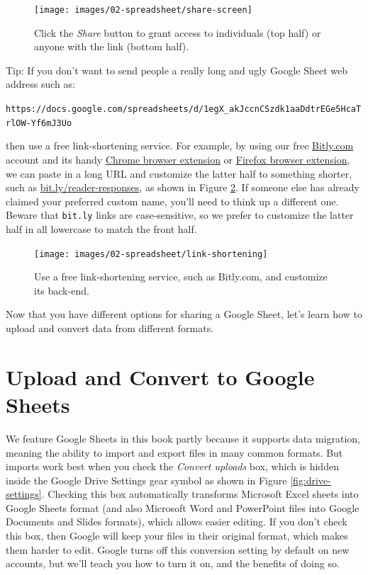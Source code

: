 \documentclass[
  english,
]{book}
\begin{document}
\begin{figure}
\texttt{[image: images/02-spreadsheet/share-screen]} \caption{Click the \emph{Share} button to grant access to individuals (top half) or anyone with the link (bottom half).}\label{fig:share-screen}
\end{figure}

Tip: If you don't want to send people a really long and ugly Google Sheet web address such as:

\texttt{https://docs.google.com/spreadsheets/d/1egX\_akJccnCSzdk1aaDdtrEGe5HcaTrlOW-Yf6mJ3Uo}

then use a free link-shortening service. For example, by using our free \href{https://bitly.com}{Bitly.com} account and its handy \href{https://chrome.google.com/webstore/detail/bitly-unleash-the-power-o/iabeihobmhlgpkcgjiloemdbofjbdcic}{Chrome browser extension} or \href{https://addons.mozilla.org/en-US/firefox/user/13352154/}{Firefox browser extension}, we can paste in a long URL and customize the latter half to something shorter, such as \href{https://bit.ly/reader-responses}{bit.ly/reader-responses}, as shown in Figure \ref{fig:link-shortening}. If someone else has already claimed your preferred custom name, you'll need to think up a different one. Beware that \texttt{bit.ly} links are case-sensitive, so we prefer to customize the latter half in all lowercase to match the front half.



\begin{figure}
\texttt{[image: images/02-spreadsheet/link-shortening]} \caption{Use a free link-shortening service, such as Bitly.com, and customize its back-end.}\label{fig:link-shortening}
\end{figure}

Now that you have different options for sharing a Google Sheet, let's learn how to upload and convert data from different formats.

\hypertarget{upload}{%
\section*{Upload and Convert to Google Sheets}\label{upload}}

We feature Google Sheets in this book partly because it supports data migration, meaning the ability to import and export files in many common formats. But imports work best when you check the \emph{Convert uploads} box, which is hidden inside the Google Drive Settings gear symbol as shown in Figure \ref{fig:drive-settings}. Checking this box automatically transforms Microsoft Excel sheets into Google Sheets format (and also Microsoft Word and PowerPoint files into Google Documents and Slides formats), which allows easier editing. If you don't check this box, then Google will keep your files in their original format, which makes them harder to edit. Google turns off this conversion setting by default on new accounts, but we'll teach you how to turn it on, and the benefits of doing so.
\end{document}
